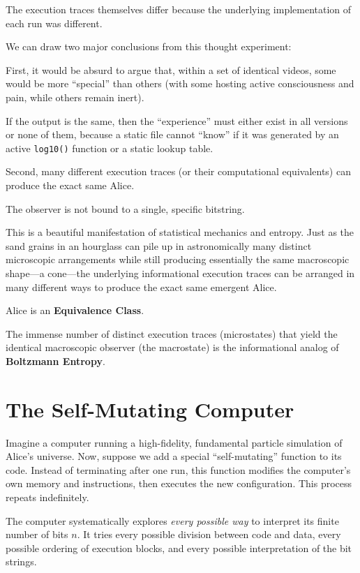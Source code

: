 The execution traces themselves differ because the underlying implementation of each run was different.

We can draw two major conclusions from this thought experiment:

First, it would be absurd to argue that, within a set of identical videos, some would be more ``special'' than others (with some hosting active consciousness and pain, while others remain inert). 

If the output is the same, then the ``experience'' must either exist in all versions or none of them, because a static file cannot ``know'' if it was generated by an active \texttt{log10()} function or a static lookup table.

Second, many different execution traces (or their computational equivalents) can produce the exact same Alice. 

The observer is not bound to a single, specific bitstring. 

This is a beautiful manifestation of statistical mechanics and entropy.
Just as the sand grains in an hourglass can pile up in astronomically many distinct microscopic arrangements while still producing essentially the same macroscopic shape---a cone---the underlying informational execution traces can be arranged in many different ways to produce the exact same emergent Alice.

Alice is an \textbf{Equivalence Class}.

The immense number of distinct execution traces (microstates) that yield the identical macroscopic observer (the macrostate) is the informational analog of \textbf{Boltzmann Entropy}.




\section{The Self-Mutating Computer}

Imagine a computer running a high-fidelity, fundamental particle simulation of Alice's universe. 
Now, suppose we add a special ``self-mutating'' function to its code. 
Instead of terminating after one run, this function modifies the computer's own memory and instructions, then executes the new configuration. 
This process repeats indefinitely.

The computer systematically explores \emph{every possible way} to interpret its finite number of bits $n$. 
It tries every possible division between code and data, every possible ordering of execution blocks, and every possible interpretation of the bit strings. 

